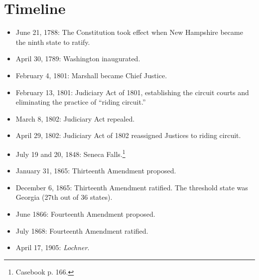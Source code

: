 \section{Timeline}

\begin{itemize}
    \item June 21, 1788: The Constitution took effect when New Hampshire 
    became the ninth state to ratify.
    \item April 30, 1789: Washington inaugurated.
    \item February 4, 1801: Marshall became Chief Justice.
    \item February 13, 1801: Judiciary Act of 1801, establishing the circuit 
    courts and eliminating the practice of ``riding circuit.''
    \item March 8, 1802: Judiciary Act repealed.
    \item April 29, 1802: Judiciary Act of 1802 reassigned Justices to riding 
    circuit.
    \item July 19 and 20, 1848: Seneca Falls.\footnote{Casebook p. 166.}
    \item January 31, 1865: Thirteenth Amendment proposed.
    \item December 6, 1865: Thirteenth Amendment ratified. The threshold state 
    was Georgia (27th out of 36 states).
    \item June 1866: Fourteenth Amendment proposed.
    \item July 1868: Fourteenth Amendment ratified.
    \item April 17, 1905: \emph{Lochner}.
\end{itemize}
